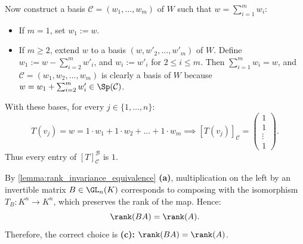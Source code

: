\begin{exercisesolution}
\begin{itemize}
    Now construct a basis $\mathcal{C} = (w_1, \dots, w_m)$ of $W$ such that $w = \sum_{i=1}^m w_i$:
    \begin{itemize}
        \item If $m = 1$, set $w_1 := w$.
        \item If $m \ge 2$, extend $w$ to a basis $(w, w'_2, \dots, w'_m)$ of $W$. Define $w_1 := w - \sum_{i=2}^m w'_i$, and $w_i := w'_i$ for $2 \le i \le m$. Then $\sum_{i=1}^m w_i = w$, and $\mathcal{C} = (w_1, w_2, \dots, w_m)$ is clearly a basis of $W$ because $w = w_1 + \sum_{i=2}^m w'_i \in \Sp(\mathcal{C})$.
    \end{itemize}
    With these bases, for every $j \in \{1, \dots, n\}$:
    \[
    T(v_j) = w = 1 \cdot w_1 + 1 \cdot w_2 + \dots + 1 \cdot w_m \implies [T(v_j)]_{\mathcal{C}} = \begin{pmatrix} 1 \\ 1 \\ \vdots \\ 1 \end{pmatrix}.
    \]
    Thus every entry of $[T]_{\mathcal{C}}^{\mathcal{B}}$ is $1$.
\end{itemize}
\end{exercisesolution}

\begin{exercisesolution*}
\label{sol:rank_invariance_invertible_matrix_sc}
By \cref{lemma:rank_invariance_equivalence} \textbf{(a)}, multiplication on the left by an invertible matrix $B \in \GL_n(K)$ corresponds to composing with the isomorphism $T_B \colon K^n \to K^n$, which preserves the rank of the map. Hence:
\[
\rank(BA) = \rank(A).
\]
Therefore, the correct choice is \textbf{(c): $\rank(BA) = \rank(A)$}.
\end{exercisesolution*}

